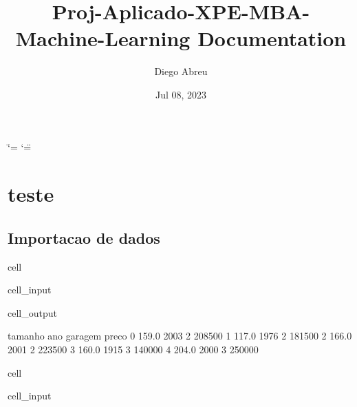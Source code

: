 \documentclass[letterpaper,10pt,brazil]{sphinxmanual}
\title{Proj-Aplicado-XPE-MBA-Machine-Learning Documentation}
\date{Jul 08, 2023}
\author{Diego Abreu}
\begin{document}
\ifdefined\shorthandoff
  \ifnum\catcode`\=\string=\active\shorthandoff{=}\fi
  \ifnum\catcode`\"=\active{}\fi
\fi

\pagestyle{empty}
\sphinxmaketitle
\pagestyle{plain}
\sphinxtableofcontents
\pagestyle{normal}
\label{\detokenize{index::doc}}


\sphinxstepscope


\chapter{teste}
\label{\detokenize{notebooks/teste:teste}}\label{\detokenize{notebooks/teste::doc}}

\section{Importacao de dados}
\label{\detokenize{notebooks/teste:importacao-de-dados}}
\begin{sphinxuseclass}{cell}
\begin{sphinxuseclass}{cell_input}
\begin{sphinxVerbatim}[commandchars=\\\{\}]
   
  
\end{sphinxVerbatim}

\end{sphinxuseclass}
\begin{sphinxuseclass}{cell_output}
\begin{sphinxVerbatim}[commandchars=\\\{\}]
   tamanho   ano  garagem   preco
0    159.0  2003        2  208500
1    117.0  1976        2  181500
2    166.0  2001        2  223500
3    160.0  1915        3  140000
4    204.0  2000        3  250000
\end{sphinxVerbatim}

\end{sphinxuseclass}
\end{sphinxuseclass}
\begin{sphinxuseclass}{cell}
\begin{sphinxuseclass}{cell_input}
\begin{sphinxVerbatim}[commandchars=\\\{\}]
  
  \PYG{p}{[}\PYG{p}{]}
\end{sphinxVerbatim}

\end{sphinxuseclass}
\end{sphinxuseclass}
\end{document}
